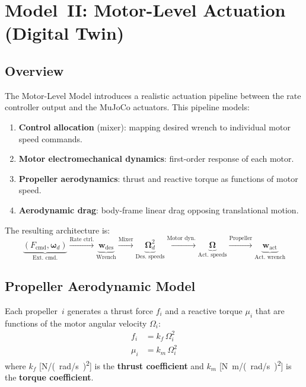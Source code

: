\documentclass[journal]{IEEEtran}
\newcommand{\w}{\mathbf{w}}
\newcommand{\bomega}{\boldsymbol{\omega}}
\newcommand{\bOmega}{\boldsymbol{\Omega}}
\begin{document}
\section{Model~II: Motor-Level Actuation (Digital Twin)}
\label{sec:model2}

\subsection{Overview}

The Motor-Level Model introduces a realistic actuation pipeline between the rate controller output and the MuJoCo actuators. This pipeline models:
\begin{enumerate}
  \item \textbf{Control allocation} (mixer): mapping desired wrench to individual motor speed commands.
  \item \textbf{Motor electromechanical dynamics}: first-order response of each motor.
  \item \textbf{Propeller aerodynamics}: thrust and reactive torque as functions of motor speed.
  \item \textbf{Aerodynamic drag}: body-frame linear drag opposing translational motion.
\end{enumerate}

The resulting architecture is:
\begin{equation*}
  \underbrace{(F_{\text{cmd}}, \bomega_d)}_{\text{Ext.\ cmd.}}
  \!\xrightarrow{\text{Rate ctrl.}}\!
  \underbrace{\w_{\text{des}}}_{\text{Wrench}}
  \!\xrightarrow{\text{Mixer}}\!
  \underbrace{\bOmega_d^2}_{\text{Des.\ speeds}}
  \!\xrightarrow{\text{Motor dyn.}}\!
  \underbrace{\bOmega}_{\text{Act.\ speeds}}
  \!\xrightarrow{\text{Propeller}}\!
  \underbrace{\w_{\text{act}}}_{\text{Act.\ wrench}}
\end{equation*}

\subsection{Propeller Aerodynamic Model}

Each propeller~$i$ generates a thrust force $f_i$ and a reactive torque $\mu_i$ that are functions of the motor angular velocity $\Omega_i$:
\begin{align}
  f_i   &= k_f \, \Omega_i^2 \label{eq:thrust_model} \\
  \mu_i &= k_m \, \Omega_i^2 \label{eq:torque_model}
\end{align}
where $k_f$ [\si{N/(rad/s)^2}] is the \textbf{thrust coefficient} and $k_m$ [\si{N.m/(rad/s)^2}] is the \textbf{torque coefficient}.
\end{document}
